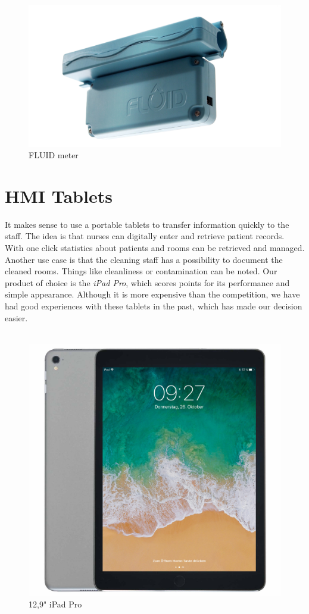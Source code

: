 \begin{figure}[h]
	\centering
	\includegraphics[width=.6\textwidth]{images/CostAnalysis/fluidMeter} 
	\caption[FLUID meter]{FLUID meter\protect\footnotemark}
	\label{fig:fluidMeter}
\end{figure}
\section{HMI Tablets}
It makes sense to use a portable tablets to transfer information quickly to the staff. The idea is that nurses can digitally enter and retrieve patient records. With one click statistics about patients and rooms can be retrieved and managed. Another use case is that the cleaning staff has a possibility to document the cleaned rooms. Things like cleanliness or contamination can be noted. Our product of choice is the \textit{iPad Pro}, which scores points for its performance and simple appearance. Although it is more expensive than the competition, we have had good experiences with these tablets in the past, which has made our decision easier.
\\
\\
\begin{figure}[h]
	\centering
	\includegraphics[width=.5\textwidth]{images/CostAnalysis/iPadPro} 
	\caption[12,9" iPad Pro]{12,9" iPad Pro\footnotemark}
	\label{fig:iPadPro}
\end{figure}
\clearpage
